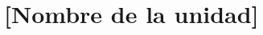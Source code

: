 \documentclass[12pt, a4paper, twoside]{book}
\begin{document}



\chapter{[Nombre de la unidad]}

%
% 
% 
% 

\end{document}
